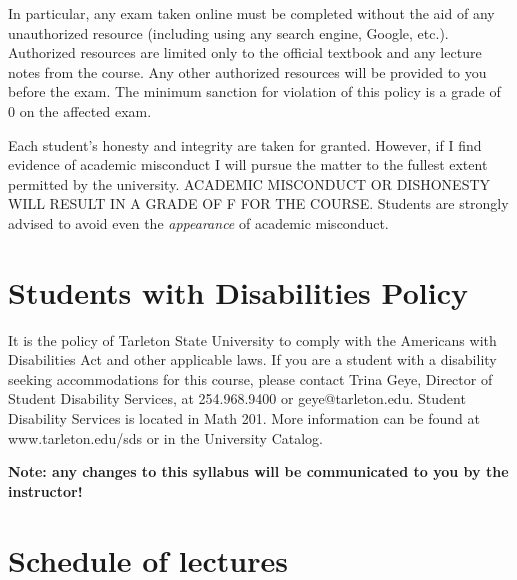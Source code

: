 \documentclass[10pt]{article}
\begin{document}
In particular, any exam taken online must be completed without the aid of any unauthorized resource (including using any search engine, Google, etc.).  Authorized resources are limited only to the official textbook and any lecture notes from the course.  Any other authorized resources will be provided to you before the exam.  The minimum sanction for violation of this policy is a grade of 0 on the affected exam.

Each student’s honesty and integrity are taken for granted. However, if I find
evidence of academic misconduct I will pursue the matter
to the fullest extent permitted by the university. ACADEMIC MISCONDUCT OR
DISHONESTY WILL RESULT IN A GRADE OF F FOR THE COURSE.  Students are
strongly advised to avoid even the \emph{appearance} of academic misconduct. 

\section*{Students with Disabilities Policy}
\label{sec-9}

It is the policy of Tarleton State University to comply with the Americans
with Disabilities Act and other applicable laws. If you are a student with a
disability seeking accommodations for this course, please contact Trina
Geye, Director of Student Disability Services, at 254.968.9400 or
geye@tarleton.edu. Student Disability Services is
located in Math 201. More information can be found at www.tarleton.edu/sds or in the University Catalog.


\textbf{\textbf{Note:  any changes to this syllabus will be communicated to you by the instructor!}}

\section*{Schedule of lectures}
\label{sec-10}
\end{document}
